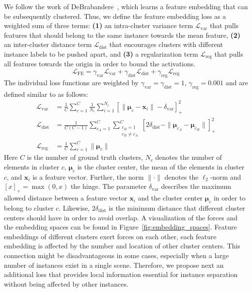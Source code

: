 \documentclass[10pt,twocolumn,letterpaper]{article}
\newcommand{\boldparagraph}[1]{\vspace{0.5em}\noindent{\bf #1} }
\newcommand{\nLoss}{\mathcal{L}}            \newcommand{\nx}{\mathbf{x}}                \newcommand{\nv}{\mathbf{v}}                \newcommand{\nz}{\mathbf{z}}                \newcommand{\nc}{\boldsymbol{\mu}}
\begin{document}
\boldparagraph{Feature Embedding Loss.}
We follow the work of DeBrabandere~\etal\cite{DeBrabandere-et-al-arXiv-2017}, which learns a feature embedding that can be subsequently clustered. 
Thus, we define the feature embedding loss as a weighted sum of three terms:
\textbf{(1)} an intra-cluster variance term $\nLoss_\text{var}$ that pulls features that should belong to the same instance towards the mean feature, 
\textbf{(2)} an inter-cluster distance term $\nLoss_\text{dist}$ that encourages clusters with different instance labels to be pushed apart, and
\textbf{(3)} a regularization term $\nLoss_\text{reg}$ that pulls all features towards the origin in order to bound the activations. \begin{equation}
  \nLoss_\text{FE} = 
    \gamma_\text{var} \nLoss_\text{var} +
    \gamma_\text{dist} \nLoss_\text{dist} +
    \gamma_\text{reg} \nLoss_\text{reg}
  \label{eq:feature_loss}
\end{equation}
The individual loss functions are weighted by $\gamma_\text{var}=\gamma_\text{dist}=1$, $\gamma_\text{reg}=0.001$ and are defined similar to \cite{DeBrabandere-et-al-arXiv-2017} as follows:
\begin{align}
  \nLoss_\text{var} &= \frac{1}{C}\sum_{c=1}^C \frac{1}{N_c} \sum_{i=1}^{N_c}
    \left[ \|\nc_c - \nx_i\| - \delta_\text{var} \right]_{+}^2 \\
\nLoss_\text{dist} &= \frac{1}{C(C-1)}\sum_{c_A=1}^C \sum_{\substack{c_B=1\\c_B\neq c_A}}^C
    \left[ 2\delta_\text{dist} - \|\nc_{c_A} - \nc_{c_B}\| \right]_{+}^2 \\
\nLoss_\text{reg} &= \frac{1}{C} \sum_{c=1}^C \|\nc_c\|
\end{align}
Here $C$ is the number of ground truth clusters, $N_c$ denotes the number of elements in cluster $c$, $\nc_c$ is the cluster center, \ie the mean of the elements in cluster $c$, and $\nx_i$ is a feature vector.
Further, the norm $\|\cdot\|$ denotes the $\ell_2$-norm and $[x]_{+} = \max(0,x)$ the hinge.
The parameter $\delta_\text{var}$ describes the maximum allowed distance between a feature vector $\nx_i$ and the cluster center $\nc_c$ in order to belong to cluster $c$.
Likewise, $2\delta_\text{dist}$ is the minimum distance that different cluster centers should have in order to avoid overlap.
A visualization of the forces and the embedding spaces can be found in Figure~\ref{fig:embedding_spaces}.
Feature embeddings of different clusters exert forces on each other, \ie each feature embedding is affected by the number and location of other cluster centers.
This connection might be disadvantageous in some cases, especially when a large number of instances exist in a single scene. 
Therefore, we propose next an additional loss that provides local information essential for instance separation without being affected by other instances.
\end{document}
